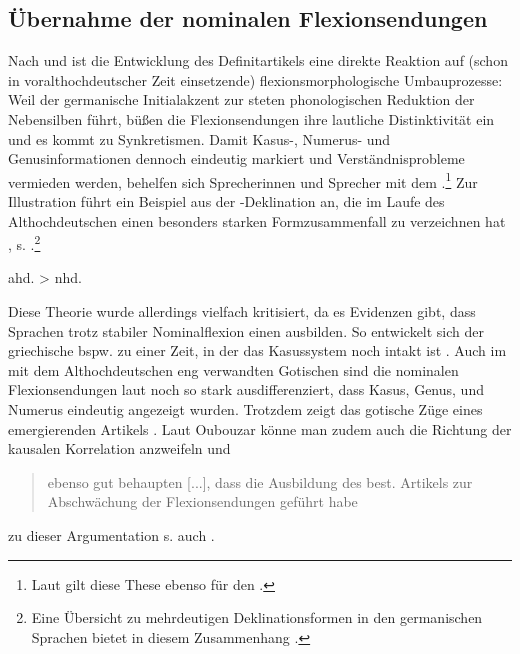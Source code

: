 \subsection{Übernahme der nominalen Flexionsendungen} \label{sec:flexion} 

Nach \textcite[168--170]{Tschirch1983} und \textcite[13]{vonPolenz2009} ist die Entwicklung des Definitartikels  eine direkte Reaktion auf (schon in voralthochdeutscher Zeit einsetzende) flexionsmorphologische  Umbauprozesse: Weil der germanische Initialakzent zur steten phonologischen Reduktion der Nebensilben führt, büßen die Flexionsendungen ihre lautliche Distinktivität ein und es kommt zu Synkretismen. Damit Kasus-, Numerus- und Genusinformationen  dennoch eindeutig markiert und Verständnisprobleme vermieden werden, behelfen sich Sprecherinnen und Sprecher mit dem .\footnote{Laut \textcite[70]{Schildt1981} gilt diese These ebenso für den .} Zur Illustration führt \textcite[13]{vonPolenz2009} ein Beispiel aus der -Deklination an, die im Laufe des Althochdeutschen einen besonders starken Formzusammenfall zu verzeichnen hat \parencite[248]{Meineke2001}, s. .\footnote{Eine Übersicht zu mehrdeutigen Deklinationsformen in den germanischen Sprachen bietet in diesem Zusammenhang \textcite[48--51]{Heinrichs1954}.} 
 
\begin{exe}
	\ex \label{ex:flexion}   
	ahd.  > nhd. 
\end{exe}

Diese Theorie wurde allerdings vielfach kritisiert, da es Evidenzen gibt, dass Sprachen trotz stabiler Nominalflexion  einen  ausbilden. So entwickelt sich der griechische  bspw. zu einer Zeit, in der das Kasussystem  noch intakt ist \parencite[44]{Ebert1978}. 
Auch im mit dem Althochdeutschen eng verwandten Gotischen sind die nominalen Flexionsendungen  laut \textcite[10]{Kovari1984} noch so stark ausdifferenziert, dass Kasus, Genus, und Numerus eindeutig angezeigt wurden. Trotzdem zeigt das gotische  Züge eines emergierenden Artikels \parencite[vgl.][114--155]{Leiss2000}. Laut Oubouzar könne man zudem auch die Richtung der kausalen Korrelation anzweifeln und \blockcquote[71]{Oubouzar1992}{ebenso gut behaupten
[...], dass die Ausbildung des best. Artikels zur Abschwächung der Flexionsendungen geführt habe}; zu dieser Argumentation s. auch \textcite[51]{Heinrichs1954}.  

